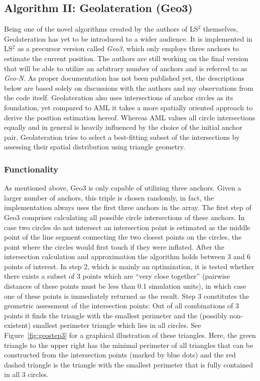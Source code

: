 \subsection{Algorithm II: Geolateration (Geo3)}
Being one of the novel algorithms created by the authors of LS$^{2}$ themselves, Geolateration has yet to be introduced to a wider audience. It is implemented in LS$^{2}$ as a precursor version called \emph{Geo3}, which only employs three anchors to estimate the current position. The authors are still working on the final version that will be able to utilize an arbitrary number of anchors and is referred to as \emph{Geo-N}. As proper documentation has not been published yet, the descriptions below are based solely on discussions with the authors and my observations from the code itself. Geolateration also uses intersections of anchor circles as its foundation, yet compared to AML it takes a more spatially oriented approach to derive the position estimation hereof. Whereas AML values all circle intersections equally and in general is heavily influenced by the choice of the initial anchor pair, Geolateration tries to select a best-fitting subset of the intersections by assessing their spatial distribution using triangle geometry.

\subsubsection{Functionality}
\label{geo3_functionality}
As mentioned above, Geo3 is only capable of utilizing three anchors. Given a larger number of anchors, this triple is chosen randomly, in fact, the implementation always uses the first three anchors in the array. The first step of Geo3 comprises calculating all possible circle intersections of these anchors. In case two circles do not intersect an intersection point is estimated as the middle point of the line segment connecting the two closest points on the circles, \ie{}the point where the circles would first touch if they were inflated. After the intersection calculation and approximation the algorithm holds between 3 and 6 points of interest. In step 2, which is mainly an optimization, it is tested whether there exists a subset of 3 points which are ``very close together'' (pairwise distances of these points must be less than 0.1 simulation units), in which case one of these points is immediately returned as the result. Step 3 constitutes the geometric assessment of the intersection points: Out of all combinations of 3 points it finds the triangle with the smallest perimeter and the (possibly non-existent) smallest perimeter triangle which lies in all circles. See Figure~\ref{fig:geostep3} for a graphical illustration of these triangles. Here, the green triangle to the upper right has the minimal perimeter of all triangles that can be constructed from the intersection points (marked by blue dots) and the red dashed triangle is the triangle with the smallest perimeter that is fully contained in all 3 circles.

